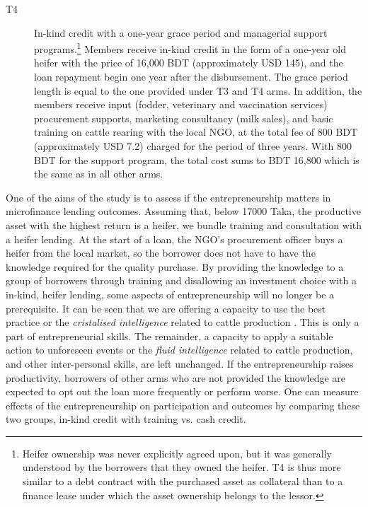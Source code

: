 \begin{description}
	\item[T4]	In-kind credit with a one-year grace period and managerial support programs.\footnote{Heifer ownership was never explicitly agreed upon, but it was generally understood by the borrowers that they owned the heifer. T4 is thus more similar to a debt contract with the purchased asset as collateral than to a finance lease under which the asset ownership belongs to the lessor. } Members receive in-kind credit in the form of a one-year old heifer with the price of 16,000 BDT (approximately USD 145), and the loan repayment begin one year after the disbursement. The grace period length is equal to the one provided under \textsf{T3} and \textsf{T4} arms. In addition, the members receive input (fodder, veterinary and vaccination services) procurement supports, marketing consultancy (milk sales), and basic training on cattle rearing with the local NGO, at the total fee of 800 BDT (approximately USD 7.2) charged for the period of three years. With 800 BDT for the support program, the total cost sums to BDT 16,800 which is the same as in all other arms.
	\end{description}

	One of the aims of the study is to assess if the entrepreneurship matters in microfinance lending outcomes. Assuming that, below 17000 Taka, the productive asset with the highest return is a heifer, we bundle training and consultation with a heifer lending. At the start of a loan, the NGO's procurement officer buys a heifer from the local market, so the borrower does not have to have the knowledge required for the quality purchase. By providing the knowledge to a group of borrowers through training and disallowing an investment choice with a in-kind, heifer lending, some aspects of entrepreneurship will no longer be a prerequisite. It can be seen that we are offering a capacity to use the best practice or the \textit{cristalised intelligence} related to cattle production \citep{Cattell1963}. This is only a part of entrepreneurial skills. The remainder, a capacity to apply a suitable action to unforeseen events or the \textit{fluid intelligence} related to cattle production, and other inter-personal skills, are left unchanged. If the entrepreneurship raises productivity, borrowers of other arms who are not provided the knowledge are expected to opt out the loan more frequently or perform worse. One can measure effects of the entrepreneurship on participation and outcomes by comparing these two groups, in-kind credit with training vs. cash credit.

